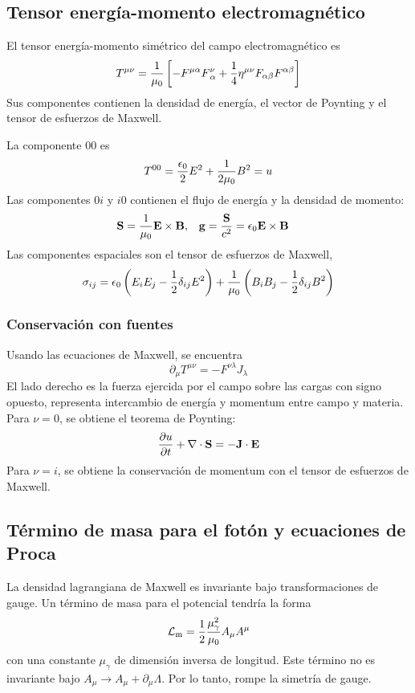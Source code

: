 \documentclass[]{article}
\numberwithin{equation}{section}
\begin{document}
\subsection{Tensor energía-momento electromagnético}
El tensor energía-momento simétrico del campo electromagnético es
\begin{equation}
	T^{\mu\nu} = \frac{1}{\mu_{0}} \left[-F^{\mu\alpha} F^{\nu}_{\, \alpha} + \frac{1}{4} \eta^{\mu\nu} F_{\alpha\beta}F^{\alpha\beta}\right]
\end{equation}
Sus componentes contienen la densidad de energía, el vector de Poynting y el tensor de esfuerzos de Maxwell.

La componente 00 es
\begin{equation}
	T^{00} = \frac{\epsilon_{0}}{2} E^2 + \frac{1}{2\mu_{0}}B^2 = u
\end{equation}
Las componentes $0i$ y $i0$ contienen el flujo de energía y la densidad de momento:
\begin{align*}
	\mathbf{S} &= \frac{1}{\mu_{0}} \mathbf{E}\times\mathbf{B}, & \mathbf{g} &= \frac{\mathbf{S}}{c^2} = \epsilon_{0} \mathbf{E}\times\mathbf{B}
\end{align*}
Las componentes espaciales son el tensor de esfuerzos de Maxwell,
\begin{equation}
	\sigma_{ij} = \epsilon_{0} \left(E_i E_j - \frac{1}{2}\delta_{ij}E^2\right) + \frac{1}{\mu_{0}} \left(B_i B_j - \frac{1}{2}\delta_{ij} B^2\right)
\end{equation}

\subsubsection{Conservación con fuentes}
Usando las ecuaciones de Maxwell, se encuentra
\begin{equation}
	\partial_\mu T^{\mu\nu} = - F^{\nu\lambda} J_{\lambda} 
\end{equation}
El lado derecho es la fuerza ejercida por el campo sobre las cargas con signo opuesto, representa intercambio de energía y momentum entre campo y materia. Para $\nu = 0$, se obtiene el teorema de Poynting:
\begin{equation}
	\dfrac{\partial u}{\partial t} + \nabla\cdot\mathbf{S} = -\mathbf{J}\cdot\mathbf{E}
\end{equation}
Para $\nu = i$, se obtiene la conservación de momentum con el tensor de esfuerzos de Maxwell.

\subsection{Término de masa para el fotón y ecuaciones de Proca}
La densidad lagrangiana de Maxwell es invariante bajo transformaciones de gauge. Un término de masa para el potencial tendría la forma
\begin{equation}
	\mathcal{L}_\mathrm{m} = \frac{1}{2} \frac{\mu_\gamma^2}{\mu_{0}} A_\mu A^\mu
\end{equation}
con una constante $\mu_\gamma$ de dimensión inversa de longitud. Este término no es invariante bajo
$A_\mu \to A_\mu + \partial_\mu \Lambda$. Por lo tanto, rompe la simetría de gauge.
\end{document}
